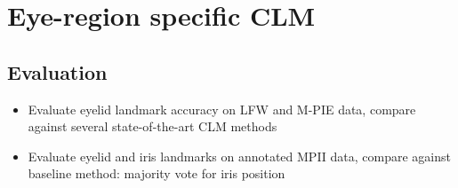
\section{Eye-region specific CLM}

\subsection{Evaluation}

\begin{itemize}
	\item Evaluate eyelid landmark accuracy on LFW and M-PIE data, compare against several state-of-the-art CLM methods
	\item Evaluate eyelid and iris landmarks on annotated MPII data, compare against baseline method: majority vote for iris position
\end{itemize}